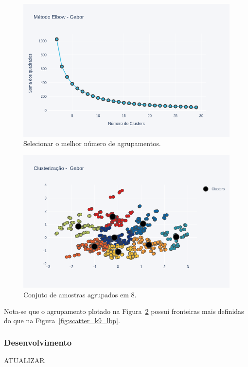 \documentclass[a4paper, 12 pt, conference]{ieeeconf}  %
\begin{document}
\begin{figure}[!htbp]
	\centering
	\includegraphics[width=1.0\linewidth,clip=true,trim=0cm 0cm 0cm 0cm, keepaspectratio=true]{points_elbow_gabor.png}
	\caption{Selecionar o melhor número de agrupamentos.}
	\label{fig:points_elbow_gabor}
\end{figure}

\begin{figure}[!htbp]
	\centering
	\includegraphics[width=1.0\linewidth,clip=true,trim=0cm 0cm 0cm 0cm, keepaspectratio=true]{scatter_k8_gabor.png}
	\caption{Conjuto de amostras agrupados em 8.}
	\label{fig:scatter_k8_gabor}
\end{figure}

Nota-se que o agrupamento plotado na Figura~\ref{fig:scatter_k8_gabor} possui fronteiras mais definidas do que na Figura~\ref{fig:scatter_k9_lbp}.

\subsubsection{Desenvolvimento} ATUALIZAR
\end{document}
